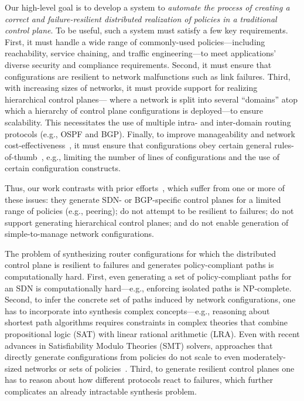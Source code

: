 Our high-level goal is to develop a system to {\em automate the
  process of creating a correct and failure-resilient distributed
  realization of policies in a traditional control plane}. To be
useful, such a system must satisfy a few key requirements. First, it
must handle a wide range of commonly-used policies---including
reachability, service chaining, and traffic engineering---to meet
applications' diverse security and compliance requirements. Second, it
must ensure that configurations are resilient to network malfunctions
such as link failures. Third, with increasing sizes of networks, it
must provide support for realizing hierarchical control planes---
where a network is split into several ``domains'' atop which a
hierarchy of control plane configurations is deployed---to ensure
scalability. This necessitates the use of multiple intra- and
inter-domain routing protocols (e.g., OSPF and BGP). Finally, to
improve manageability and network
cost-effectiveness~\cite{mpa:imc15,complexity:sigcomm11}, it must
ensure that configurations obey certain general
rules-of-thumb~\cite{complexity:nsdi09}, e.g., limiting the number of
lines of configurations and the use of certain configuration
constructs.


Thus, our work contrasts with prior efforts~\cite{netegg, propane,
  merlin, simple, fattire, netkat, netkatcompiler, sol}, which suffer
from one or more of these issues: they generate SDN- or BGP-specific
control planes for a limited range of policies (e.g., peering); do not
attempt to be resilient to failures; do not support generating
hierarchical control planes; and do not enable generation of
simple-to-manage network configurations. 

The problem of synthesizing router configurations for which the
distributed control plane is resilient to failures and generates
policy-compliant paths is computationally hard.  First, even
generating a set of policy-compliant paths for an SDN is
computationally hard---e.g., enforcing isolated paths is NP-complete.
Second, to infer the concrete set of paths induced by network
configurations, one has to incorporate into synthesis complex
concepts---e.g., reasoning about shortest path algorithms requires
constraints in complex theories that combine propositional logic (SAT)
with linear rational arithmetic (LRA). Even with recent advances in
Satisfiability Modulo Theories (SMT) solvers, approaches that directly
generate configurations from policies do not scale to even
moderately-sized networks or sets of policies~\cite{synet}.  Third, to
generate resilient control planes one has to reason about how
different protocols react to failures, which further complicates an
already intractable synthesis problem.

